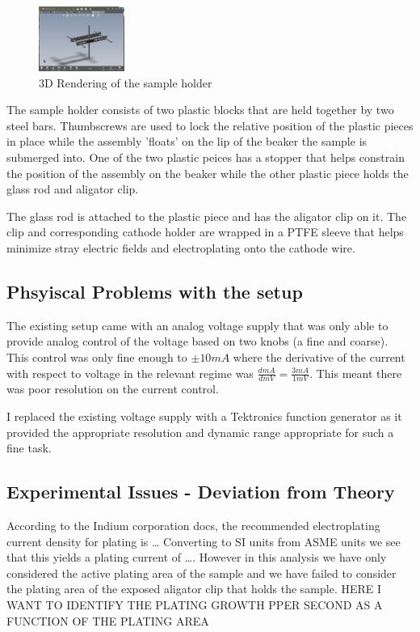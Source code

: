\begin{figure}
    \centering
    \includegraphics[width=0.25\textwidth]{Main/Ch1/Sample_holder.png}
    \caption{3D Rendering of the sample holder}
\end{figure}

The sample holder consists of two plastic blocks that are held together by two steel bars. Thumbscrews are used to lock the relative position of the plastic pieces in place while the assembly 'floats'  on the lip of the beaker the sample is submerged into. One of the two plastic peices has a stopper that helps constrain the position of the assembly on the beaker while the other plastic piece holds the glass rod and aligator clip.

The glass rod is attached to the plastic piece and has the aligator clip on it. The clip and corresponding cathode holder are wrapped in a PTFE sleeve that helps minimize stray electric fields and electroplating onto the cathode wire.



\subsection{Phsyiscal Problems with the setup}


The existing setup came with an analog voltage supply that was only able to provide analog control of the voltage based on two knobs (a fine and coarse). This control was only fine enough to $\pm10mA$ where the derivative of the current with respect to voltage in the relevant regime was $\frac{d mA}{d mV} = \frac{3 mA}{1 mV}$. This meant there was poor resolution on the current control.

I replaced the existing voltage supply with a Tektronics function generator as it provided the appropriate resolution and dynamic range appropriate for such a fine task.

\subsection{Experimental Issues - Deviation from Theory}

According to the Indium corporation docs, the recommended electroplating current density for plating is \dots
Converting to SI units from ASME units we see that this yields a plating current of \dots . However in this analysis we have only considered the active plating area of the sample and we have failed to consider the plating area of the exposed aligator clip that holds the sample.
HERE I WANT TO IDENTIFY THE PLATING GROWTH PPER SECOND AS A FUNCTION OF THE PLATING AREA

